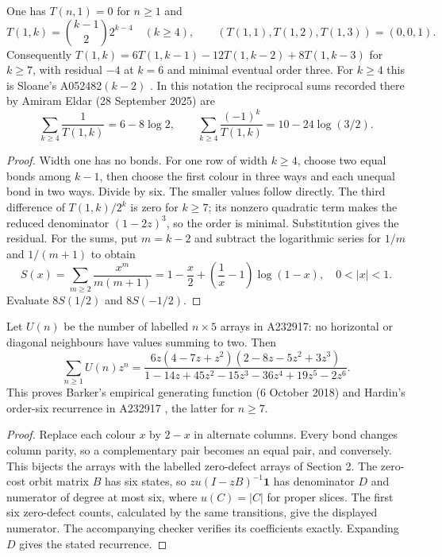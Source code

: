 \begin{corollary}\label{cor:rowone}
One has $T(n,1)=0$ for $n\geq1$ and
\[
T(1,k)=\binom{k-1}{2}2^{k-4}\quad(k\geq4),\qquad
(T(1,1),T(1,2),T(1,3))=(0,0,1).
\]
Consequently $T(1,k)=6T(1,k-1)-12T(1,k-2)+8T(1,k-3)$ for
$k\geq7$, with residual $-4$ at $k=6$ and minimal eventual order three.
For $k\geq4$ this is Sloane's A052482$(k-2)$ \cite{sloane}.
In this notation the reciprocal sums recorded there by Amiram Eldar
(28 September 2025) are
\[
\sum_{k\geq4}\frac1{T(1,k)}=6-8\log2,\qquad
\sum_{k\geq4}\frac{(-1)^k}{T(1,k)}=10-24\log(3/2).
\]
\end{corollary}
\begin{proof}
Width one has no bonds. For one row of width $k\geq4$, choose two
equal bonds among $k-1$, then choose the first colour in three ways
and each unequal bond in two ways. Divide by six. The smaller values
follow directly. The third difference of $T(1,k)/2^k$ is zero for
$k\geq7$; its nonzero quadratic term makes the reduced denominator
$(1-2z)^3$, so the order is minimal. Substitution gives the residual.
For the sums, put $m=k-2$ and subtract the logarithmic series for
$1/m$ and $1/(m+1)$ to obtain
\[
S(x)=\sum_{m\geq2}\frac{x^m}{m(m+1)}
=1-\frac{x}{2}+\left(\frac1x-1\right)\log(1-x),\quad 0<|x|<1.
\]
Evaluate $8S(1/2)$ and $8S(-1/2)$.
\end{proof}

\begin{corollary}\label{cor:zero}
Let $U(n)$ be the number of labelled $n\times5$ arrays in A232917:
no horizontal or diagonal neighbours have values summing to two.
Then
\[
\sum_{n\geq1}U(n)z^n
=\frac{6z(4-7z+z^2)(2-8z-5z^2+3z^3)}
 {1-14z+45z^2-15z^3-36z^4+19z^5-2z^6}.
\]
This proves Barker's empirical generating function (6 October 2018)
and Hardin's order-six recurrence in A232917 \cite{zerowidthfive},
the latter for $n\geq7$.
\end{corollary}
\begin{proof}
Replace each colour $x$ by $2-x$ in alternate columns. Every bond
changes column parity, so a complementary pair becomes an equal pair,
and conversely. This bijects the arrays with the labelled zero-defect
arrays of Section 2. The zero-cost orbit matrix $B$ has six states,
so $z u(I-zB)^{-1}\mathbf1$ has denominator $D$ and numerator of
degree at most six, where $u(C)=|C|$ for proper slices.
The first six zero-defect counts, calculated by the same transitions,
give the displayed numerator. The accompanying checker verifies its
coefficients exactly. Expanding $D$ gives the stated recurrence.
\end{proof}

